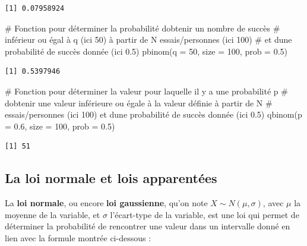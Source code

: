 \documentclass[
  letterpaper,
]{book}
\newenvironment{Shaded}{\begin{snugshade}}{\end{snugshade}}
\newcommand{\AttributeTok}[1]{\textcolor[rgb]{0.40,0.45,0.13}{#1}}
\newcommand{\CommentTok}[1]{\textcolor[rgb]{0.37,0.37,0.37}{#1}}
\newcommand{\DecValTok}[1]{\textcolor[rgb]{0.68,0.00,0.00}{#1}}
\newcommand{\FloatTok}[1]{\textcolor[rgb]{0.68,0.00,0.00}{#1}}
\newcommand{\FunctionTok}[1]{\textcolor[rgb]{0.28,0.35,0.67}{#1}}
\newcommand{\NormalTok}[1]{\textcolor[rgb]{0.00,0.23,0.31}{#1}}
\begin{document}
\begin{verbatim}
[1] 0.07958924
\end{verbatim}

\begin{Shaded}
\begin{Highlighting}[]
\CommentTok{\# Fonction pour déterminer la probabilité d\textquotesingle{}obtenir un nombre de succès}
\CommentTok{\# inférieur ou égal à q (ici 50) à partir de N essais/personnes (ici 100) }
\CommentTok{\# et d\textquotesingle{}une probabilité de succès donnée (ici 0.5)}
\FunctionTok{pbinom}\NormalTok{(}\AttributeTok{q =} \DecValTok{50}\NormalTok{, }\AttributeTok{size =} \DecValTok{100}\NormalTok{, }\AttributeTok{prob =} \FloatTok{0.5}\NormalTok{)}
\end{Highlighting}
\end{Shaded}

\begin{verbatim}
[1] 0.5397946
\end{verbatim}

\begin{Shaded}
\begin{Highlighting}[]
\CommentTok{\# Fonction pour déterminer la valeur pour laquelle il y a une probabilité p }
\CommentTok{\# d\textquotesingle{}obtenir une valeur inférieure ou égale à la valeur définie à partir de N }
\CommentTok{\# essais/personnes (ici 100) et d\textquotesingle{}une probabilité de succès donnée (ici 0.5)}
\FunctionTok{qbinom}\NormalTok{(}\AttributeTok{p =} \FloatTok{0.6}\NormalTok{, }\AttributeTok{size =} \DecValTok{100}\NormalTok{, }\AttributeTok{prob =} \FloatTok{0.5}\NormalTok{)}
\end{Highlighting}
\end{Shaded}

\begin{verbatim}
[1] 51
\end{verbatim}

\subsection{La loi normale et lois
apparentées}\label{la-loi-normale-et-lois-apparentuxe9es}

La \textbf{loi normale}, ou encore \textbf{loi gaussienne}, qu'on note
\(X \sim N(\mu, \sigma)\), avec \(\mu\) la moyenne de la variable, et
\(\sigma\) l'écart-type de la variable, est une loi qui permet de
déterminer la probabilité de rencontrer une valeur dans un intervalle
donné en lien avec la formule montrée ci-dessous :
\end{document}
